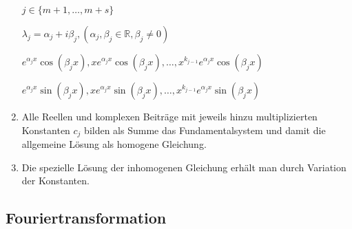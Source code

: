 \documentclass[twoside]{article}
\begin{document}
\begin{enumerate}[1.]
						\begin{math}
							j \in \{ m+1, \dots, m+s\}
						\end{math}
						
						\begin{math}
							\lambda_j = \alpha_j + i \beta_j, (\alpha_j, \beta_j \in \mathbb{R}, \beta_j \neq 0)
						\end{math}
						
						\begin{math}
							e^{\alpha_jx} \cos (\beta_jx), x e^{\alpha_jx} \cos (\beta_jx), \dots, x^{k_{j-1}} e^{\alpha_jx} \cos (\beta_jx)
						\end{math}
						
						\begin{math}
							e^{\alpha_jx} \sin (\beta_jx), x e^{\alpha_jx} \sin (\beta_jx), \dots, x^{k_{j-1}} e^{\alpha_jx} \sin (\beta_jx)
						\end{math}
						
					\item Alle Reellen und komplexen Beiträge mit jeweils hinzu multiplizierten Konstanten \begin{math} c_j \end{math} bilden als Summe das Fundamentalsystem und damit die allgemeine Lösung als homogene Gleichung.
					
					\item Die spezielle Lösung der inhomogenen Gleichung erhält man durch Variation der Konstanten.
				\end{enumerate}
				
			
				
		\subsection{Fouriertransformation}
			
\end{document}

